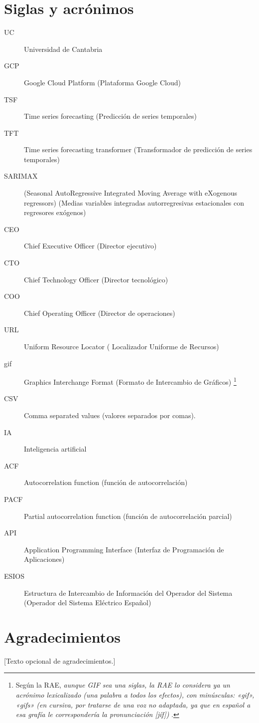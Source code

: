 \clearpage
\hypersetup{linkcolor=black}
\tableofcontents\clearpage
\listoffigures\clearpage
\listoftables\clearpage
\hypersetup{linkcolor=linkscolor}

\chapter*{Siglas y acrónimos}
%
%
\begin{description}
    \item[UC] Universidad de Cantabria
    \item[GCP] Google Cloud Platform (Plataforma Google Cloud)
    \item[TSF] Time series forecasting (Predicción de series temporales)
    \item[TFT] Time series forecasting transformer (Transformador de predicción de series temporales) 
    \item[SARIMAX] (Seasonal AutoRegressive Integrated Moving Average with eXogenous regressors) (Medias variables integradas autorregresivas estacionales con regresores exógenos)
    \item[CEO] Chief Executive Officer (Director ejecutivo)
    \item[CTO] Chief Technology Officer (Director tecnológico)
    \item[COO] Chief Operating Officer (Director de operaciones)
    \item[URL] Uniform Resource Locator ( Localizador Uniforme de Recursos)
    \item[gif] Graphics Interchange Format (Formato de Intercambio de Gráficos) \footnote{ Según la RAE, \textit{aunque GIF sea una siglas, la RAE lo considera ya un acrónimo lexicalizado (una palabra a todos los efectos), con minúsculas: «gif», «gifs» (en cursiva, por tratarse de una voz no adaptada, ya que en español a esa grafía le correspondería la pronunciación [jíf])} \cite{rae2018tweet}.} 
    \item[CSV] Comma separated values (valores separados por comas).
    \item[IA] Inteligencia artificial
    \item[ACF] Autocorrelation function (función de autocorrelación)
    \item[PACF] Partial autocorrelation function (función de autocorrelación parcial)
    \item[API] Application Programming Interface (Interfaz de Programación de Aplicaciones)
    \item[ESIOS] Estructura de Intercambio de Información del Operador del Sistema (Operador del Sistema Eléctrico Español)  
\end{description}

\chapter*{Agradecimientos}
[Texto opcional de agradecimientos.]